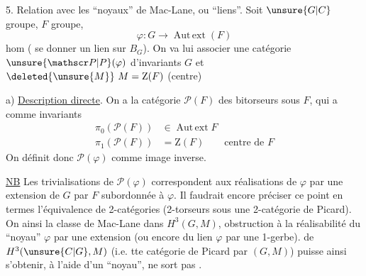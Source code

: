 5. Relation avec les ``noyaux'' de Mac-Lane, ou ``liens''. Soit $\unsure{G|C}$ groupe, $F$ groupe,
\[
\varphi\colon G\longrightarrow\operatorname{Aut\,ext}(F)
\]
hom ( se donner un lien sur $B_G$). On va lui associer une catégorie  $\unsure{\mathscr P|P}(\varphi)$ d'invariants $G$ et $\deleted{\unsure{M}}\ M=\mathrm Z(F)$ (centre)

a) \uline{Description directe}. On a la  catégorie $\mathscr P(F)$ des bitorseurs sous $F$, qui a comme invariants
\[
\begin{aligned}
\pi_0(\mathscr P(F))&\in\operatorname{Aut\,ext}F\\
\pi_1(\mathscr P(F))&=\mathrm Z(F)\qquad\text{centre de }F
\end{aligned}
\]
On définit donc $\mathscr P(\varphi)$ comme image inverse.


\uline{NB} Les trivialisations de $\mathscr P(\varphi)$ correspondent aux réalisations de $\varphi$ par une extension de $G$ par $F$ subordonnée à $\varphi$. Il faudrait encore préciser ce point en termes  l'équivalence de 2-catégories (2-torseurs sous une 2-catégorie de Picard). On  ainsi la classe de Mac-Lane dans $H^3(G,M)$, obstruction à la réalisabilité du ``noyau'' $\varphi$ par une extension (ou encore du lien $\varphi$ par une 1-gerbe).     de $H^3(\unsure{C|G},M)$ (i.e. tte catégorie de Picard  par $(G,M)$) puisse ainsi s'obtenir, à l'aide d'un ``noyau'', ne sort pas  .
